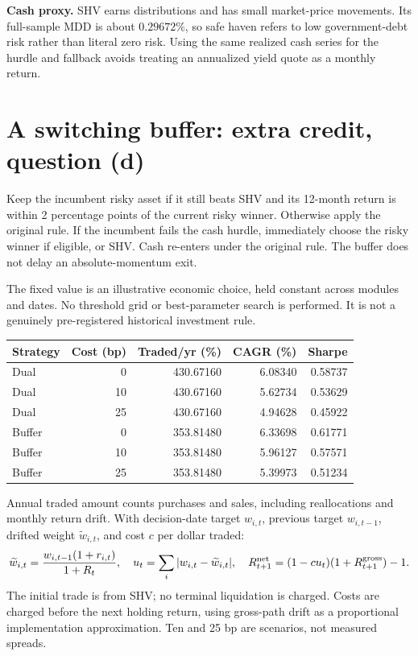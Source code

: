\documentclass[11pt,letterpaper]{article}
\begin{document}
\textbf{Cash proxy.} SHV earns distributions and has small market-price movements. Its full-sample MDD is about \(0.29672\%\), so safe haven refers to low government-debt risk rather than literal zero risk. Using the same realized cash series for the hurdle and fallback avoids treating an annualized yield quote as a monthly return.

\newpage
\section{A switching buffer: extra credit, question (d)}
Keep the incumbent risky asset if it still beats SHV and its 12-month return is within 2 percentage points of the current risky winner. Otherwise apply the original rule. If the incumbent fails the cash hurdle, immediately choose the risky winner if eligible, or SHV. Cash re-enters under the original rule. The buffer does not delay an absolute-momentum exit.

The fixed value is an illustrative economic choice, held constant across modules and dates. No threshold grid or best-parameter search is performed. It is not a genuinely pre-registered historical investment rule.
\begin{center}\small\begin{tabular}{lrrrr}\toprule
Strategy & Cost (bp) & Traded/yr (\%) & CAGR (\%) & Sharpe\\\midrule
Dual & 0 & 430.67160 & 6.08340 & 0.58737\\
Dual & 10 & 430.67160 & 5.62734 & 0.53629\\
Dual & 25 & 430.67160 & 4.94628 & 0.45922\\
Buffer & 0 & 353.81480 & 6.33698 & 0.61771\\
Buffer & 10 & 353.81480 & 5.96127 & 0.57571\\
Buffer & 25 & 353.81480 & 5.39973 & 0.51234\\
\bottomrule\end{tabular}\end{center}
Annual traded amount counts purchases and sales, including reallocations and monthly return drift. With decision-date target \(w_{i,t}\), previous target \(w_{i,t-1}\), drifted weight \(\widetilde w_{i,t}\), and cost \(c\) per dollar traded:
\[
 \widetilde w_{i,t}=\frac{w_{i,t-1}(1+r_{i,t})}{1+R_t},\quad
 u_t=\sum_i|w_{i,t}-\widetilde w_{i,t}|,\quad
 R_{t+1}^{\rm net}=(1-cu_t)(1+R_{t+1}^{\rm gross})-1.
\]
The initial trade is from SHV; no terminal liquidation is charged. Costs are charged before the next holding return, using gross-path drift as a proportional implementation approximation. Ten and 25 bp are scenarios, not measured spreads.
\end{document}
